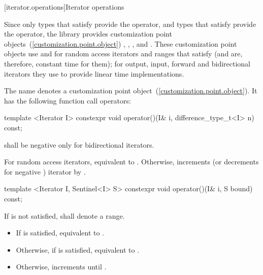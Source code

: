 [iterator.operations]{Iterator operations}

\pnum
Since only types that satisfy
 provide the \tcode{+} operator, and
types that satisfy  provide the \tcode{-}
operator, the library provides customization point objects~(\ref{customization.point.object})
, , , and .
These
customization point objects
use
\tcode{+}
and
\tcode{-}
for random access iterators and ranges that satisfy  (and are, therefore, constant
time for them); for output, input, forward and bidirectional iterators they use
\tcode{++}
to provide linear time
implementations.

%
\pnum
The name  denotes a
customization point object~(\ref{customization.point.object}).
It has the following function call operators:

\begin{itemdecl}
template <Iterator I>
  constexpr void operator()(I& i, difference_type_t<I> n) const;
\end{itemdecl}

\begin{itemdescr}
\pnum
\requires
{}
shall be negative only for bidirectional iterators.

\pnum
\effects
For random access iterators, equivalent to .
Otherwise, increments (or decrements for negative
)
iterator
by
.
\end{itemdescr}

\begin{itemdecl}
template <Iterator I, Sentinel<I> S>
  constexpr void operator()(I& i, S bound) const;
\end{itemdecl}

\begin{itemdescr}
\pnum
\requires
If
 is not satisfied, 
shall denote a range.

\pnum
\effects
\begin{itemize}
\item If  is satisfied,
      equivalent to .

\item Otherwise, if
       is satisfied, equivalent to .

\item Otherwise, increments  until .
\end{itemize}
\end{itemdescr}

